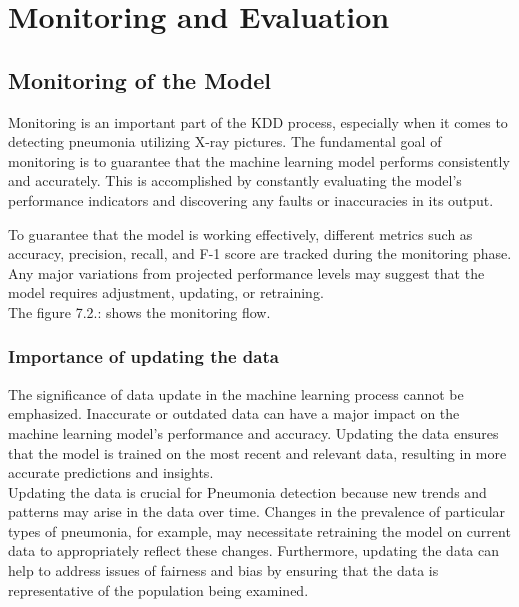 %
%
%



\chapter{Monitoring and Evaluation}

\section{Monitoring of the Model}

Monitoring is an important part of the KDD process, especially when it comes to detecting pneumonia utilizing X-ray pictures. The fundamental goal of monitoring is to guarantee that the machine learning model performs consistently and accurately. This is accomplished by constantly evaluating the model's performance indicators and discovering any faults or inaccuracies in its output.\autocite{Fayyad:1996}

To guarantee that the model is working effectively, different metrics such as accuracy, precision, recall, and F-1 score are tracked during the monitoring phase. Any major variations from projected performance levels may suggest that the model requires adjustment, updating, or retraining.\\

The figure 7.2.: shows the monitoring flow.\\

\subsection{Importance of updating the data}

The significance of data update in the machine learning process cannot be emphasized. Inaccurate or outdated data can have a major impact on the machine learning model's performance and accuracy. Updating the data ensures that the model is trained on the most recent and relevant data, resulting in more accurate predictions and insights.\\

Updating the data is crucial for Pneumonia detection because new trends and patterns may arise in the data over time. Changes in the prevalence of particular types of pneumonia, for example, may necessitate retraining the model on current data to appropriately reflect these changes. Furthermore, updating the data can help to address issues of fairness and bias by ensuring that the data is representative of the population being examined.\autocite{Wang:2017}

